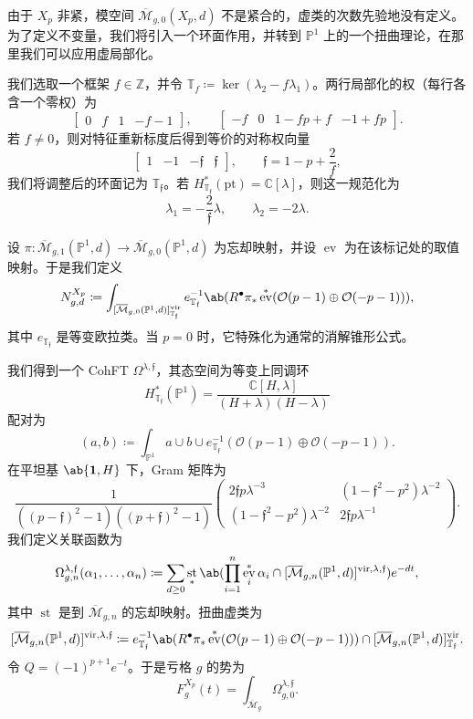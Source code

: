 \documentclass{amsart}
\theoremstyle{definition}
\theoremstyle{remark}
\theoremstyle{plain}
\theoremstyle{definition}
\theoremstyle{remark}
\newcommand{\C}{\mathbb{C}}
\newcommand{\Z}{\mathbb{Z}}
\renewcommand{\P}{\mathbb{P}}
\newcommand{\Mbar}{\overline{\mathcal{M}}}
\newcommand{\mc}[1]{\mathcal{#1}}
\newcommand{\T}{\mathbb{T}}
\newcommand{\mf}[1]{\mathfrak{#1}}
\newcommand{\mr}[1]{\mathrm{#1}}
\newcommand{\1}{\mathbf{1}}
\newcommand{\2}{\mathbf{2}}
\newcommand{\3}{\mathbf{3}}
\newcommand{\vir}{\mr{vir}}
\DeclareMathOperator{\ev}{ev}
\DeclareMathOperator{\st}{st}
\begin{document}
由于 \(X_p\) 非紧，模空间 \(\Mbar_{g,0}(X_p,d)\) 不是紧合的，虚类的次数先验地没有定义。为了定义不变量，我们将引入一个环面作用，并转到 \(\P^1\) 上的一个扭曲理论，在那里我们可以应用虚局部化。

我们选取一个框架 \(f \in \Z\)，并令 \(\T_f \coloneqq \ker(\lambda_2 - f\lambda_1)\)。两行局部化的权（每行各含一个零权）为
\[ \begin{bmatrix} 0 & f & 1 & -f-1 \end{bmatrix}, \qquad \begin{bmatrix} -f & 0 & 1-fp+f & -1+fp \end{bmatrix}. \]
若 \(f \neq 0\)，则对特征重新标度后得到等价的对称权向量
\[ \begin{bmatrix} 1 & -1 & -\mf{f} & \mf{f} \end{bmatrix}, \qquad \mf{f} = 1-p+\frac{2}{f}, \]
我们将调整后的环面记为 \(\T_{\mf{f}}\)。若 \(H^*_{\T_{\mf{f}}}(\mr{pt}) = \C[\lambda]\)，则这一规范化为
\[ \lambda_1 = -\frac{2}{\mf{f}}\lambda, \qquad \lambda_2 = -2\lambda. \]

设 \(\pi \colon \Mbar_{g,1}(\P^1,d) \to \Mbar_{g,0}(\P^1,d)\) 为忘却映射，并设 \(\ev\) 为在该标记处的取值映射。于是我们定义
\[ N^{X_p}_{g,d} \coloneqq \int_{[\Mbar_{g,0}(\P^1,d)]^{\vir}_{\T_{\mf{f}}}} e_{\T_{\mf{f}}}^{-1}\ab(R^{\bullet}\pi_* \ev^*(\mc{O}(p-1)\oplus\mc{O}(-p-1))), \]
其中 \(e_{\T_{\mf{f}}}\) 是等变欧拉类。当 \(p=0\) 时，它特殊化为通常的消解锥形公式。

我们得到一个 CohFT \(\Omega^{\lambda,\mf{f}}\)，其态空间为等变上同调环
\[ H^*_{\T_{\mf{f}}}(\P^1) = \frac{\C[H,\lambda]}{(H+\lambda)(H-\lambda)} \]
配对为
\[ (a,b) \coloneqq \int_{\P^1} a \cup b \cup e^{-1}_{\T_{\mf{f}}}(\mc{O}(p-1)\oplus\mc{O}(-p-1)). \]
在平坦基 \(\ab\{\1,H\}\) 下，Gram 矩阵为
\[ \frac{1}{((p-\mf{f})^2-1)((p+\mf{f})^2-1)}\begin{pmatrix} 2\mf{f}p\lambda^{-3} & (1-\mf{f}^2-p^2)\lambda^{-2} \\ (1-\mf{f}^2-p^2)\lambda^{-2} & 2\mf{f}p\lambda^{-1} \end{pmatrix}. \]
我们定义关联函数为
\[ \Omega^{\lambda,\mf{f}}_{g,n}(\alpha_1,\ldots,\alpha_n) \coloneqq \sum_{d\geq0}\st_*\ab(\prod_{i=1}^n \ev_i^*\alpha_i \cap [\Mbar_{g,n}(\P^1,d)]^{\vir,\lambda,\mf{f}})e^{-dt}, \]
其中 \(\st\) 是到 \(\Mbar_{g,n}\) 的忘却映射。扭曲虚类为
\[ [\Mbar_{g,n}(\P^1,d)]^{\vir,\lambda,\mf{f}} \coloneqq e^{-1}_{\T_{\mf{f}}}\ab(R^{\bullet}\pi_*\ev^*(\mc{O}(p-1)\oplus\mc{O}(-p-1))) \cap [\Mbar_{g,n}(\P^1,d)]^{\vir}_{\T_{\mf{f}}}. \]
令 \(Q = (-1)^{p+1}e^{-t}\)。于是亏格 \(g\) 的势为
\[ F^{X_p}_g(t) = \int_{\Mbar_g} \Omega^{\lambda,\mf{f}}_{g,0}. \]
\end{document}
